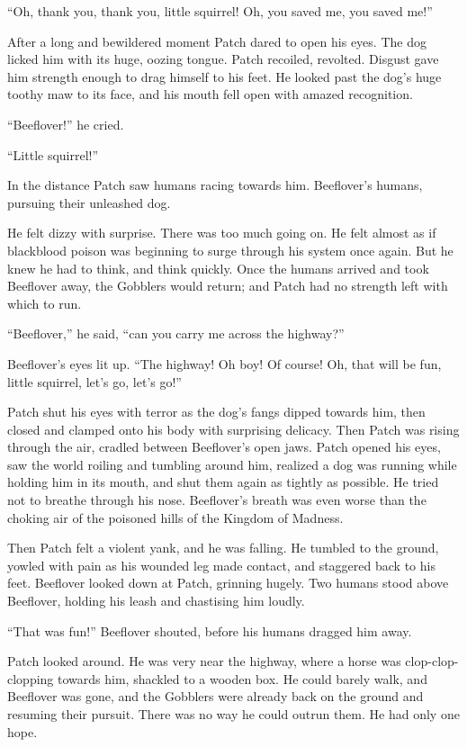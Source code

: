 \documentclass[ebook,oneside,openany,12pt]{memoir}
\begin{document}
“Oh, thank you, thank you, little squirrel! Oh, you saved me, you
saved me!”

After a long and bewildered moment Patch dared to open his eyes. The
dog licked him with its huge, oozing tongue. Patch recoiled,
revolted. Disgust gave him strength enough to drag himself to his
feet. He looked past the dog’s huge toothy maw to its face, and his
mouth fell open with amazed recognition.

“Beeflover!” he cried.

“Little squirrel!”

In the distance Patch saw humans racing towards him. Beeflover’s
humans, pursuing their unleashed dog.

He felt dizzy with surprise. There was too much going on. He felt
almost as if blackblood poison was beginning to surge through his
system once again. But he knew he had to think, and think
quickly. Once the humans arrived and took Beeflover away, the Gobblers
would return; and Patch had no strength left with which to run.

“Beeflover,” he said, “can you carry me across the highway?”

Beeflover’s eyes lit up. “The highway! Oh boy! Of course! Oh, that
will be fun, little squirrel, let’s go, let’s go!”

Patch shut his eyes with terror as the dog’s fangs dipped towards him,
then closed and clamped onto his body with surprising delicacy. Then
Patch was rising through the air, cradled between Beeflover’s open
jaws. Patch opened his eyes, saw the world roiling and tumbling around
him, realized a dog was running while holding him in its mouth, and
shut them again as tightly as possible. He tried not to breathe
through his nose. Beeflover’s breath was even worse than the choking
air of the poisoned hills of the Kingdom of Madness.

Then Patch felt a violent yank, and he was falling. He tumbled to the
ground, yowled with pain as his wounded leg made contact, and
staggered back to his feet. Beeflover looked down at Patch, grinning
hugely. Two humans stood above Beeflover, holding his leash and
chastising him loudly.

“That was fun!” Beeflover shouted, before his humans dragged him away.

Patch looked around. He was very near the highway, where a horse was
clop-clop-clopping towards him, shackled to a wooden box. He could
barely walk, and Beeflover was gone, and the Gobblers were already
back on the ground and resuming their pursuit. There was no way he
could outrun them. He had only one hope.
\end{document}
